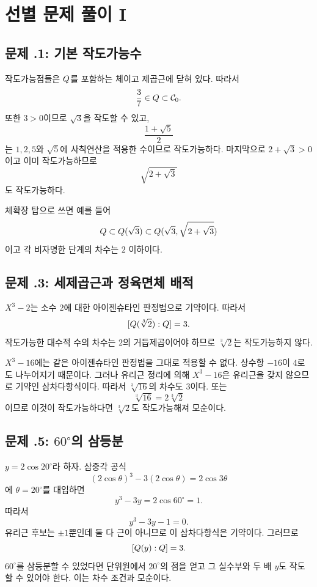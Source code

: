\clearpage
\section{선별 문제 풀이 I}
\label{sec:construction-solutions-a}

\subsection*{문제 \thechapter.1: 기본 작도가능수}

\begin{solution}
작도가능점들은 $Q$를 포함하는 체이고 제곱근에 닫혀 있다. 따라서
\[
  \frac37\in Q\subset\mathcal C_0.
\]
또한 $3>0$이므로 $\sqrt3$을 작도할 수 있고,
\[
  \frac{1+\sqrt5}{2}
\]
는 $1,2,5$와 $\sqrt5$에 사칙연산을 적용한 수이므로 작도가능하다. 마지막으로 $2+\sqrt3>0$이고 이미 작도가능하므로
\[
  \sqrt{2+\sqrt3}
\]
도 작도가능하다.

체확장 탑으로 쓰면 예를 들어
\[
  Q\subset Q(\sqrt3)
  \subset Q(\sqrt3,\sqrt{2+\sqrt3})
\]
이고 각 비자명한 단계의 차수는 $2$ 이하이다.
\end{solution}

\subsection*{문제 \thechapter.3: 세제곱근과 정육면체 배적}

\begin{solution}
$X^3-2$는 소수 $2$에 대한 아이젠슈타인 판정법으로 기약이다. 따라서
\[
  [Q(\sqrt[3]2):Q]=3.
\]
작도가능한 대수적 수의 차수는 $2$의 거듭제곱이어야 하므로 $\sqrt[3]2$는 작도가능하지 않다.

$X^3-16$에는 같은 아이젠슈타인 판정법을 그대로 적용할 수 없다. 상수항 $-16$이 $4$로도 나누어지기 때문이다. 그러나 유리근 정리에 의해 $X^3-16$은 유리근을 갖지 않으므로 기약인 삼차다항식이다. 따라서 $\sqrt[3]{16}$의 차수도 $3$이다. 또는
\[
  \sqrt[3]{16}=2\sqrt[3]2
\]
이므로 이것이 작도가능하다면 $\sqrt[3]2$도 작도가능해져 모순이다.
\end{solution}

\subsection*{문제 \thechapter.5: $60^\circ$의 삼등분}

\begin{solution}
$y=2\cos20^\circ$라 하자. 삼중각 공식
\[
  (2\cos\theta)^3-3(2\cos\theta)=2\cos3\theta
\]
에 $\theta=20^\circ$를 대입하면
\[
  y^3-3y=2\cos60^\circ=1.
\]
따라서
\[
  y^3-3y-1=0.
\]
유리근 후보는 $\pm1$뿐인데 둘 다 근이 아니므로 이 삼차다항식은 기약이다. 그러므로
\[
  [Q(y):Q]=3.
\]
$60^\circ$를 삼등분할 수 있었다면 단위원에서 $20^\circ$의 점을 얻고 그 실수부와 두 배 $y$도 작도할 수 있어야 한다. 이는 차수 조건과 모순이다.
\end{solution}

